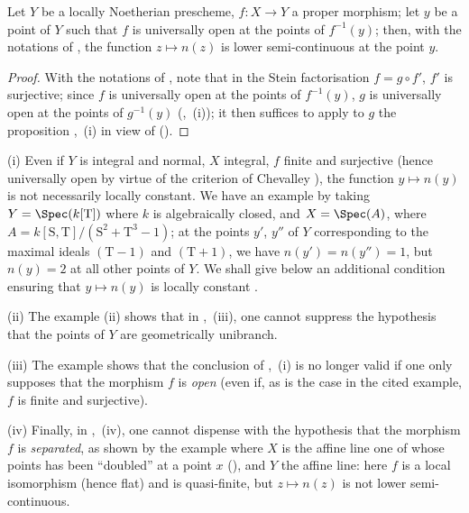 \begin{corollary}[15.5.4]
\label{IV.15.5.4}
Let $Y$ be a locally Noetherian prescheme, $f:X\to Y$ a proper morphism; let $y$ be a point of $Y$ such that $f$ is universally open at the points of $f^{-1}(y)$;
then, with the notations of , the function $z\mapsto n(z)$ is lower semi-continuous at the point $y$.
\end{corollary}

\begin{proof}
With the notations of , note that in the Stein factorisation $f=g\circ f'$, $f'$ is surjective; since $f$ is universally open at the points of $f^{-1}(y)$, $g$ is universally open at the points of $g^{-1}(y)$ (,~(i)); it then suffices to apply to $g$ the proposition ,~(i) in view of ().
\end{proof}

\begin{remarks}[15.5.5]
\label{IV.15.5.5}
(i)
Even if $Y$ is integral and normal, $X$ integral, $f$ finite and surjective (hence universally open by virtue of the criterion of Chevalley ), the function $y\mapsto n(y)$ is not necessarily locally constant.
We have an example by taking $Y=\Spec(k[\mathrm{T}])$ where $k$ is algebraically closed, and $X=\Spec(A)$, where $A=k[\mathrm{S},\mathrm{T}]/(\mathrm{S}^2+\mathrm{T}^3-1)$; at the points $y'$, $y''$ of $Y$ corresponding to the maximal ideals $(\mathrm{T}-1)$ and $(\mathrm{T}+1)$, we have $n(y')=n(y'')=1$, but $n(y)=2$ at all other points of $Y$.
We shall give below an additional condition ensuring that $y\mapsto n(y)$ is locally constant .

(ii)
The example  (ii) shows that in ,~(iii), one cannot suppress the hypothesis that the points of $Y$ are geometrically unibranch.

(iii)
The example  shows that the conclusion of ,~(i) is no longer valid if one only supposes that the morphism $f$ is \emph{open} (even if, as is the case in the cited example, $f$ is finite and surjective).

(iv)
Finally, in ,~(iv), one cannot dispense with the hypothesis that the morphism $f$ is \emph{separated}, as shown by the example where $X$ is the affine line one of whose points has been ``doubled'' at a point $x$ (), and $Y$ the affine line: here $f$ is a local isomorphism (hence flat) and is quasi-finite, but $z\mapsto n(z)$ is not lower semi-continuous.
\end{remarks}


